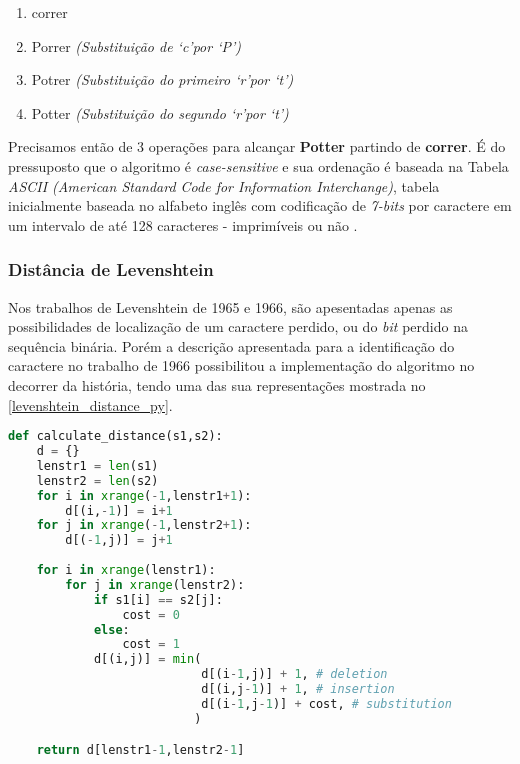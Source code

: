 \begin{enumerate}[start=0]
	\item correr
	\item Porrer \textit{(Substituição de \lq c\rq por \lq P\rq)}
	\item Potrer \textit{(Substituição do primeiro \lq r\rq por \lq t\rq)}
	\item Potter \textit{(Substituição do segundo \lq r\rq por \lq t\rq)}
\end{enumerate}

Precisamos então de 3 operações para alcançar \textbf{Potter} partindo de \textbf{correr}. É do pressuposto que o algoritmo é \textit{case-sensitive} e sua ordenação é baseada na Tabela \textit{ASCII (American Standard Code for Information Interchange)}, tabela inicialmente baseada no alfabeto inglês com codificação de \textit{7-bits} por caractere em um intervalo de até 128 caracteres - imprimíveis ou não \cite{shirey2007rfc}.


\subsubsection{Distância de Levenshtein}
\label{sub:algoritmo_da_distancia}

Nos trabalhos de Levenshtein de 1965 e 1966, são apesentadas apenas as possibilidades de localização de um caractere perdido, ou do \textit{bit} perdido na sequência binária. Porém a descrição apresentada para a identificação do caractere no trabalho de 1966 \cite{levenshtein1966} possibilitou a implementação do algoritmo no decorrer da história, tendo uma das sua representações mostrada no \autoref{levenshtein_distance_py}.

\begin{lstlisting}[language=Python,label=levenshtein_distance_py,caption={Implementação da distância de Levenshtein}]
def calculate_distance(s1,s2):
    d = {}
    lenstr1 = len(s1)
    lenstr2 = len(s2)
    for i in xrange(-1,lenstr1+1):
        d[(i,-1)] = i+1
    for j in xrange(-1,lenstr2+1):
        d[(-1,j)] = j+1
 
    for i in xrange(lenstr1):
        for j in xrange(lenstr2):
            if s1[i] == s2[j]:
                cost = 0
            else:
                cost = 1
            d[(i,j)] = min(
                           d[(i-1,j)] + 1, # deletion
                           d[(i,j-1)] + 1, # insertion
                           d[(i-1,j-1)] + cost, # substitution
                          )

    return d[lenstr1-1,lenstr2-1]
\end{lstlisting}

